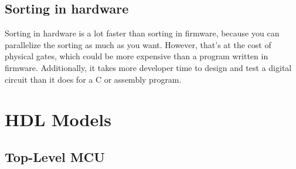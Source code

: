 \documentclass{article}
\begin{document}
\subsection{Sorting in hardware}

Sorting in hardware is a lot faster than sorting in firmware, because you can parallelize the sorting as 
much as you want. However, that's at the cost of physical gates, which could be more expensive than a program 
written in firmware. Additionally, it takes more developer time to design and test a digital circuit 
than it does for a C or assembly program. 

\pagebreak

\section{HDL Models}

\subsection{Top-Level MCU}
\end{document}
